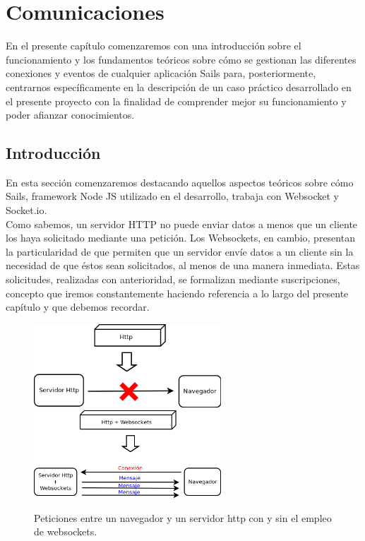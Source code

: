 

\newpage

\chapter{Comunicaciones}
\label{chap:comunicaciones}

En el presente capítulo comenzaremos con una introducción sobre el funcionamiento y los fundamentos teóricos sobre cómo se gestionan las diferentes conexiones y eventos de cualquier aplicación
Sails para, posteriormente, centrarnos específicamente en la descripción de un caso práctico desarrollado en el presente proyecto con la finalidad de comprender mejor su funcionamiento y poder afianzar
conocimientos.


\section{Introducción}
\label{sec:fundamentos}

En esta sección comenzaremos destacando aquellos aspectos teóricos sobre cómo Sails, framework Node JS utilizado en el desarrollo, trabaja con Websocket y Socket.io.\\

Como sabemos, un servidor HTTP no puede enviar datos a menos que un cliente los haya solicitado mediante una petición. Los Websockets\cite{book:WebSocket}, en cambio, presentan la particularidad de que
permiten que un servidor envíe datos a un cliente sin la necesidad de que éstos sean solicitados, al menos de una manera inmediata. Estas solicitudes, realizadas con anterioridad, se formalizan mediante suscripciones, concepto que 
iremos constantemente haciendo referencia a lo largo del presente capítulo y que debemos recordar.\\


\begin{figure}%
    \centering
    \includegraphics[width=7cm]{diagramas/http-weboscket.png}
    \qquad
    \includegraphics[width=7cm]{diagramas/http+weboscket.png}
    \caption{Peticiones entre un navegador y un servidor http con y sin el empleo de websockets.}%
    \label{fig:http-request}%
\end{figure}


